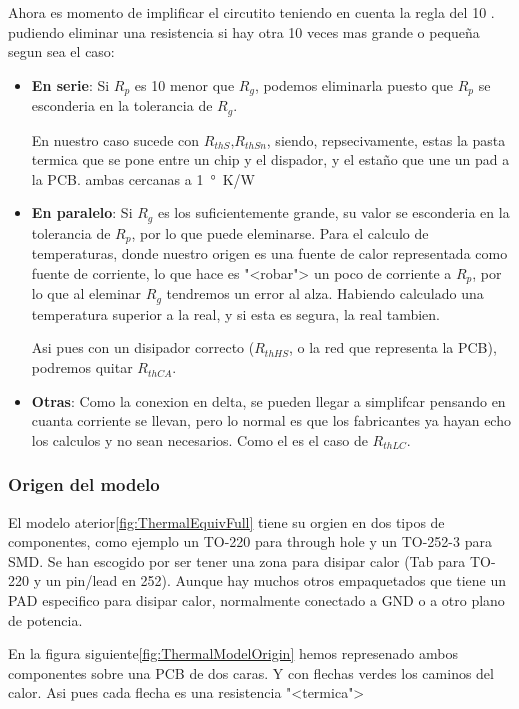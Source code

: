 Ahora es momento de implificar el circutito teniendo en cuenta la regla del 10
. pudiendo eliminar una resistencia
si hay otra 10 veces mas grande o pequeña segun sea el caso:
\begin{itemize}
    \item \textbf{En serie}: Si $R_p$ es 10 menor que $R_g$, podemos eliminarla puesto que
          $R_p$ se esconderia en la tolerancia de $R_g$.

          En nuestro caso sucede con $R_{thS}$,$R_{thSn}$, siendo, repsecivamente, estas la pasta
          termica que se pone entre un chip y el dispador, y el estaño que une un pad a la PCB.
          ambas cercanas a \SI{1}{\degree\kelvin/\watt}
    \item \textbf{En paralelo}: Si $R_g$ es los suficientemente grande, su valor se esconderia
          en la tolerancia de $R_p$, por lo que puede eleminarse. Para el calculo de temperaturas, donde nuestro
          origen es una fuente de calor representada como fuente de corriente, lo que hace es "<robar">
          un poco de corriente a $R_p$, por lo que al eleminar $R_g$ tendremos un error al alza.
          Habiendo calculado una temperatura superior a la real, y si esta es segura, la real tambien.

          Asi pues con un disipador correcto ($R_{thHS}$, o la red que representa la PCB), podremos quitar
          $R_{thCA}$.
    \item \textbf{Otras}: Como la conexion en delta, se pueden llegar a simplifcar
          pensando en cuanta corriente se llevan, pero lo normal es que los fabricantes ya
          hayan echo los calculos y no sean necesarios. Como el es el caso de $R_{thLC}$.
\end{itemize}

\subsubsection{Origen del modelo}

El modelo aterior\ref{fig:ThermalEquivFull} tiene su orgien en dos tipos de componentes, como ejemplo
un TO-220 para through hole y un TO-252-3 para SMD. Se han escogido por ser tener una zona
para disipar calor (Tab para TO-220 y un pin/lead en 252). Aunque hay muchos otros empaquetados
que tiene un PAD especifico para disipar calor, normalmente conectado a GND o a otro
plano de potencia.

En la figura siguiente\ref{fig:ThermalModelOrigin} hemos represenado ambos componentes sobre una PCB
de dos caras. Y con flechas verdes los caminos del calor. Asi pues cada flecha es una resistencia "<termica">

